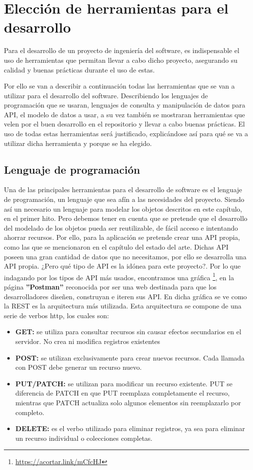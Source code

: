 \section{Elección de herramientas para el desarrollo}

Para el desarrollo de un proyecto de ingeniería del software, es indispensable el uso de herramientas que permitan llevar a cabo dicho proyecto, asegurando su calidad y buenas prácticas durante el uso de estas.

Por ello se van a describir a continuación todas las herramientas que se van a utilizar para el desarrollo del software. Describiendo los lenguajes de programación que se usaran, lenguajes de consulta y manipulación de datos para API, el modelo de datos a usar, a su vez también se mostraran herramientas que velen por el buen desarrollo en el repositorio y llevar a cabo buenas prácticas. El uso de todas estas herramientas será justificado, explicándose así para qué se va a utilizar dicha herramienta y porque se ha elegido.

\subsection{Lenguaje de programación}

Una de las principales herramientas para el desarrollo de software es el lenguaje de programación, un lenguaje que sea afín a las necesidades del proyecto. Siendo así un necesario un lenguaje para modelar los objetos descritos en este capítulo, en el primer hito. Pero debemos tener en cuenta que se pretende que el desarrollo del modelado de los objetos pueda ser reutilizable, de fácil acceso e intentando ahorrar recursos. Por ello, para la aplicación se pretende crear una API propia, como las que se mencionaron en el capítulo del estado del arte. Dichas API poseen una gran cantidad de datos que no necesitamos, por ello se desarrolla una API propia. ¿Pero qué tipo de API es la idónea para este proyecto?. Por lo que indagando por los tipos de API más usados, encontramos una gráfica \footnote{\url{https://acortar.link/mCfcHJ}}, en la página \textbf{''Postman''} reconocida por ser una web destinada para que los desarrolladores diseñen, construyan e iteren sus API. En dicha gráfica se ve como la REST es la arquitectura más utilizada. Esta arquitectura se compone de una serie de verbos http, los cuales son: 
\begin{itemize}
\item \textbf{GET:} se utiliza para consultar recursos sin causar efectos secundarios en el servidor. No crea ni modifica registros existentes
\item \textbf{POST:} se utilizan exclusivamente para crear nuevos recursos. Cada llamada con POST debe generar un recurso nuevo.
\item \textbf{PUT/PATCH:} se utilizan para modificar un recurso existente. PUT se diferencia de PATCH en que PUT reemplaza completamente el recurso, mientras que PATCH actualiza solo algunos elementos sin reemplazarlo por completo.
\item \textbf{DELETE:} es el verbo utilizado para eliminar registros, ya sea para eliminar un recurso individual o colecciones completas.
\end{itemize}

